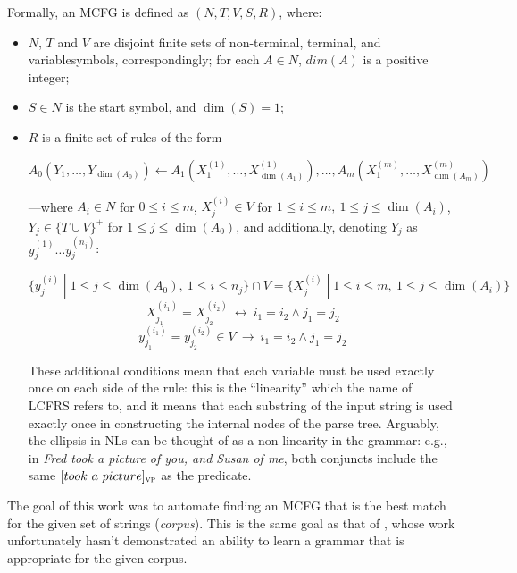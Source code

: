 \documentclass{article}
\begin{document}
Formally, an MCFG is defined as $(N,T,V,S,R)$, where:
\begin{itemize}
  \item $N$, $T$ and $V$
    are disjoint finite sets of non-terminal, terminal, and variable\linebreak symbols, correspondingly;
    for each $A\in N$, $dim(A)$ is a positive integer;
  \item $S\in N$  is the start symbol, and $\dim(S)=1$;
  \item $R$  is a finite set of rules of the form
    \begin{adjustwidth}{-2em}{0pt}\vspace{-2em}
      $$ A_0(Y_1,\ldots,Y_{\dim(A_0)}) \leftarrow A_1(X^{(1)}_1,\ldots,X^{(1)}_{\dim(A_1)}),\ldots,A_m(X^{(m)}_1,\ldots,X^{(m)}_{\dim(A_m)}) $$
    \end{adjustwidth}\vspace{-1em}
    ---where $A_i \in N$ for $0\leq i\leq m$, $X^{(i)}_j\in V$ for $1\leq i\leq m,\ 1\leq j\leq\dim(A_i)$,
    $Y_j\in \{T\cup V\}^+$ for $1\leq j\leq\dim(A_0)$,
    and additionally, denoting $Y_j$ as $y^{(1)}_j\ldots y^{(n_j)}_j$:
    \begin{adjustwidth}{-2.5em}{0pt}\vspace{-2em}
      $$ \{y^{(i)}_j\;|\;1\leq j\leq\dim(A_0),\ 1\leq i\leq n_j\}\cap V = \{X^{(i)}_j\;|\;1\leq i\leq m,\ 1\leq j\leq\dim(A_i)\} $$
      $$ X^{(i_1)}_{j_1} = X^{(i_2)}_{j_2}\ \longleftrightarrow\ i_1=i_2 \land j_1=j_2 $$
      $$ y^{(i_1)}_{j_1} = y^{(i_2)}_{j_2} \in V\ \longrightarrow\ i_1=i_2 \land j_1=j_2 $$
    \end{adjustwidth}
    These additional conditions mean that each variable must be used exactly once on each side of the rule:
    this is the ``linearity'' which the name of LCFRS refers to, and it means that each substring
    of the input string is used exactly once in constructing the internal nodes of the parse tree.
    Arguably, the ellipsis in NLs can be thought of as a non-linearity in the grammar:
    e.g., in \emph{Fred took a picture of you, and Susan of me}, both conjuncts include the same
    $[took\ a\ picture]_\textsc{vp}$ as the predicate.
\end{itemize}

The goal of this work was to automate finding an MCFG that is the best match for the given set of strings (\emph{corpus}).
This is the same goal as that of \cite{keinan}, whose work unfortunately hasn't demonstrated an ability
to learn a grammar that is appropriate for the given corpus.
\end{document}
